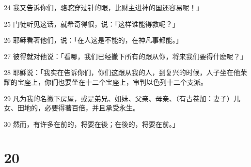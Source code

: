 \par 24 我又告诉你们，骆驼穿过针的眼，比财主进神的国还容易呢！」
\par 25 门徒听见这话，就希奇得很，说：「这样谁能得救呢？」
\par 26 耶稣看著他们，说：「在人这是不能的，在神凡事都能。」
\par 27 彼得就对他说：「看哪，我们已经撇下所有的跟从你，将来我们要得什麽呢？」
\par 28 耶稣说：「我实在告诉你们，你们这跟从我的人，到复兴的时候，人子坐在他荣耀的宝座上，你们也要坐在十二个宝座上，审判以色列十二个支派。
\par 29 凡为我的名撇下房屋，或是弟兄、姐妹、父亲、母亲、（有古卷加：妻子）儿女、田地的，必要得著百倍，并且承受永生。
\par 30 然而，有许多在前的，将要在後；在後的，将要在前。」

\chapter{20}

